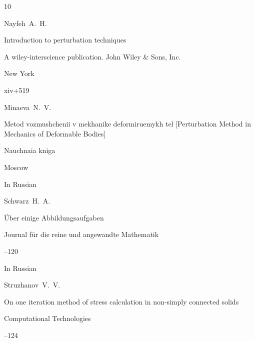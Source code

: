 \begin{thebibliography}{10}

\by Nayfeh~A.~H.

\book Introduction to perturbation techniques


\publ A wiley-interscience publication. John Wiley \& Sons, Inc.

\publaddr New York

\totalpages xiv+519






\by Minaeva~N.~V.

\book Metod vozmushchenii v mekhanike deformiruemykh tel \rm [Perturbation Method in Mechanics of Deformable Bodies]


\publ Nauchnaia kniga

\publaddr Moscow


\lang In Russian






\by Schwarz~H.~A.

\paper \"Uber einige Abbildungsaufgaben

\jour Journal f\"ur die reine und angewandte Mathematik



–120





\lang In Russian

\by Struzhanov~V.~V.

\paper  On one iteration method of stress calculation in non-simply connected solids 

\jour Computational Technologies




--124 





\end{thebibliography}





%

